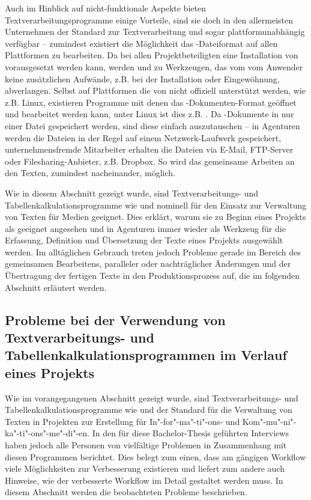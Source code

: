 Auch im Hinblick auf nicht-funktionale Aspekte bieten Textverarbeitungsprogramme einige Vorteile, sind sie doch in den allermeisten Unternehmen der Standard zur Textverarbeitung und sogar plattformunabhängig verfügbar -- zumindest existiert die Möglichkeit das -Dateiformat auf allen Plattformen zu bearbeiten. Da bei allen Projektbeteiligten eine Installation von  vorausgesetzt werden kann, werden  und  zu  Werkzeugen, das vom vom Anwender keine zusätzlichen Aufwände, z.B. bei der Installation oder Eingewöhnung, abverlangen. Selbst auf Plattformen die von  nicht offiziell unterstützt werden, wie z.B. Linux, existieren Programme mit denen das -Dokumenten-Format geöffnet und bearbeitet werden kann, unter Linux ist dies z.B. . Da -Dokumente in nur einer Datei gespeichert werden, sind diese einfach auszutauschen -- in Agenturen werden die Dateien in der Regel auf einem Netzwerk-Laufwerk gespeichert, unternehmensfremde Mitarbeiter erhalten die Dateien via E-Mail, FTP-Server oder Filesharing-Anbieter, z.B. Dropbox. So wird das gemeinsame Arbeiten an den Texten, zumindest nacheinander, möglich. 

\secbar

Wie in diesem Abschnitt gezeigt wurde, sind Textverarbeitungs- und Tabellenkalkulationsprogramme wie   und  nominell für den Einsatz zur Verwaltung von Texten für Medien geeignet. Dies erklärt, warum sie zu Beginn eines Projekts als geeignet angesehen und in Agenturen immer wieder als Werkzeug für die Erfassung, Definition und Übersetzung der Texte eines Projekts ausgewählt werden. Im alltäglichen Gebrauch treten jedoch Probleme gerade im Bereich des gemeinsamen Bearbeitens, paralleler oder nachträglicher Änderungen und der Übertragung der fertigen Texte in den Produktionsprozess auf, die im folgenden Abschnitt erläutert werden.

\subsection{Probleme bei der Verwendung von Textverarbeitungs- und Tabellenkalkulationsprogrammen im Verlauf eines Projekts}
\label{l:officeprobleme}

Wie im vorangegangenen Abschnitt gezeigt wurde, sind Textverarbeitungs- und Tabellenkalkulationsprogramme wie   und  der Standard für die Verwaltung von Texten in Projekten zur Erstellung für In"-for"-ma"-ti"-ons- und Kom"-mu"-ni"-ka"-ti"-ons"-me"-di"-en. In den für diese Bachelor-Thesis geführten Interviews haben jedoch alle Personen von vielfältige Problemen in Zusammenhang mit diesen Programmen berichtet. Dies belegt zum einen, dass am gängigen Workflow viele Möglichkeiten zur Verbesserung existieren und liefert zum andere auch Hinweise, wie der verbesserte Workflow im Detail gestaltet werden muss. In diesem Abschnitt werden die beobachteten Probleme beschrieben.

